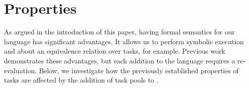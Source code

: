 \section{Properties}
\label{sec:properties}

As argued in the introduction of this paper, having formal semantics for our \TOP language has significant advantages.
It allows us to perform symbolic execution and about an equivalence relation over tasks, for example.
Previous work demonstrates these advantages, but each addition to the language requires a re-evaluation.
Below, we investigate how the previously established properties of tasks are affected by the addition of task pools to \TOPHAT.



% 
